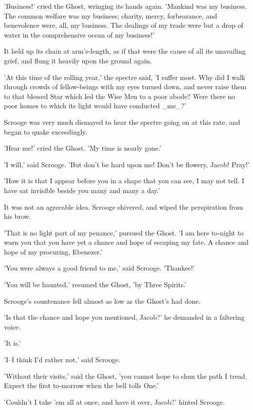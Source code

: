 'Business!' cried the Ghost, wringing its hands again. 'Mankind was my
business. The common welfare was my business; charity, mercy,
forbearance, and benevolence were, all, my business. The dealings of my
trade were but a drop of water in the comprehensive ocean of my
business!'

It held up its chain at arm's-length, as if that were the cause of all
its unavailing grief, and flung it heavily upon the ground again.

'At this time of the rolling year,' the spectre said, 'I suffer most.
Why did I walk through crowds of fellow-beings with my eyes turned down,
and never raise them to that blessed Star which led the Wise Men to a
poor abode? Were there no poor homes to which its light would have
conducted _me_?'

Scrooge was very much dismayed to hear the spectre going on at this
rate, and began to quake exceedingly.

'Hear me!' cried the Ghost. 'My time is nearly gone.'

'I will,' said Scrooge. 'But don't be hard upon me! Don't be flowery,
Jacob! Pray!'

'How it is that I appear before you in a shape that you can see, I may
not tell. I have sat invisible beside you many and many a day.'

It was not an agreeable idea. Scrooge shivered, and wiped the
perspiration from his brow.

'That is no light part of my penance,' pursued the Ghost. 'I am here
to-night to warn you that you have yet a chance and hope of escaping my
fate. A chance and hope of my procuring, Ebenezer.'

'You were always a good friend to me,' said Scrooge. 'Thankee!'

'You will be haunted,' resumed the Ghost, 'by Three Spirits.'

Scrooge's countenance fell almost as low as the Ghost's had done.

'Is that the chance and hope you mentioned, Jacob?' he demanded in a
faltering voice.

'It is.'

'I--I think I'd rather not,' said Scrooge.

'Without their visits,' said the Ghost, 'you cannot hope to shun the
path I tread. Expect the first to-morrow when the bell tolls One.'

'Couldn't I take 'em all at once, and have it over, Jacob?' hinted
Scrooge.

